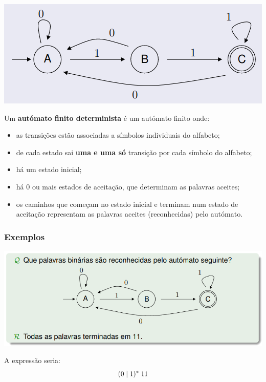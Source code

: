 \documentclass{article}
\begin{document}
\begin{flushleft}
  \begin{center}
    \includegraphics[scale=0.5]{29}
  \end{center}

  \item Um \textbf{autómato finito determinista} é um autómato finito onde:
  \begin{itemize}
    \item as transições estão associadas a símbolos individuais do alfabeto;
    \item de cada estado sai \textbf{uma e uma só} transição por cada símbolo do alfabeto;
    \item há um estado inicial;
    \item há 0 ou mais estados de aceitação, que determinam as palavras aceites;
    \item os caminhos que começam no estado inicial e terminam num estado de aceitação representam as
    palavras aceites (reconhecidas) pelo autómato.
  \end{itemize}

  \subsubsection{Exemplos}

  \begin{center}
      \includegraphics[scale=0.4]{30}
  \end{center}

    A expressão seria:
    \[(0 \hspace{1mm} | \hspace{1mm} 1)^* \hspace{1mm} 11\]


\end{flushleft}
\end{document}
